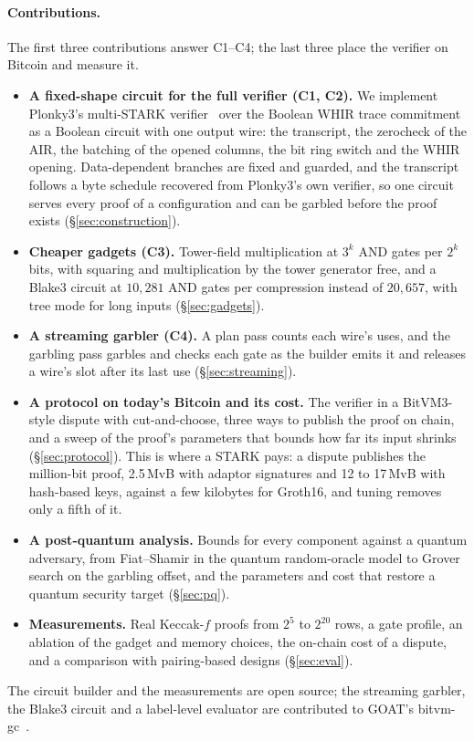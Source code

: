 \documentclass[11pt]{article}
\newcommand{\AND}{\textsf{AND}}
\begin{document}
\paragraph{Contributions.} The first three contributions answer C1--C4; the
last three place the verifier on Bitcoin and measure it.
\begin{itemize}
  \item \textbf{A fixed-shape circuit for the full verifier (C1, C2).} We
    implement Plonky3's multi-STARK verifier~\cite{plonky3} over the Boolean WHIR
    trace commitment as a Boolean circuit with one output wire: the transcript,
    the zerocheck of the AIR, the batching of the opened columns, the bit ring
    switch and the WHIR opening. Data-dependent branches are fixed and guarded,
    and the transcript follows a byte schedule recovered from Plonky3's own
    verifier, so one circuit serves every proof of a configuration and can be
    garbled before the proof exists (\S\ref{sec:construction}).
  \item \textbf{Cheaper gadgets (C3).} Tower-field multiplication at $3^k$ \AND{}
    gates per $2^k$ bits, with squaring and multiplication by the tower generator
    free, and a Blake3 circuit at $10{,}281$ \AND{} gates per compression instead
    of $20{,}657$, with tree mode for long inputs (\S\ref{sec:gadgets}).
  \item \textbf{A streaming garbler (C4).} A plan pass counts each wire's uses,
    and the garbling pass garbles and checks each gate as the builder emits it and
    releases a wire's slot after its last use (\S\ref{sec:streaming}).
  \item \textbf{A protocol on today's Bitcoin and its cost.} The verifier in a
    BitVM3-style dispute with cut-and-choose, three ways to publish the proof on
    chain, and a sweep of the proof's parameters that bounds how far its
    input shrinks (\S\ref{sec:protocol}). This is where a STARK pays: a dispute
    publishes the million-bit proof, 2.5\,MvB with adaptor signatures and 12 to
    17\,MvB with hash-based keys, against a few kilobytes for Groth16, and tuning
    removes only a fifth of it.
  \item \textbf{A post-quantum analysis.} Bounds for every component against a
    quantum adversary, from Fiat--Shamir in the quantum random-oracle model to
    Grover search on the garbling offset, and the parameters and cost that
    restore a quantum security target (\S\ref{sec:pq}).
  \item \textbf{Measurements.} Real Keccak-$f$ proofs from $2^5$ to $2^{20}$ rows,
    a gate profile, an ablation of the gadget and memory choices, the on-chain
    cost of a dispute, and a comparison with pairing-based designs
    (\S\ref{sec:eval}).
\end{itemize}
The circuit builder and the measurements are open source; the streaming
garbler, the Blake3 circuit and a label-level evaluator are contributed to
GOAT's bitvm-gc~\cite{bitvmgc}.
\end{document}
